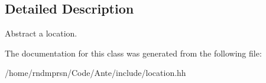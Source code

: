 \subsection{Detailed Description}
Abstract a location. 

The documentation for this class was generated from the following file\+:\begin{DoxyCompactItemize}
\item 
/home/rndmprsn/\+Code/\+Ante/include/location.\+hh\end{DoxyCompactItemize}
